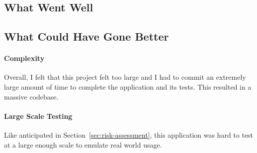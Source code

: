 \subsection{What Went Well}



\subsection{What Could Have Gone Better}

\paragraph*{Complexity}
Overall, I felt that this project felt too large and I had to commit an extremely large amount of time to complete the application and its tests. This resulted in a massive codebase.



\paragraph*{Large Scale Testing}
Like anticipated in Section~\ref{sec:risk-assessment}, this application was hard to test at a large enough scale to emulate real world usage.
